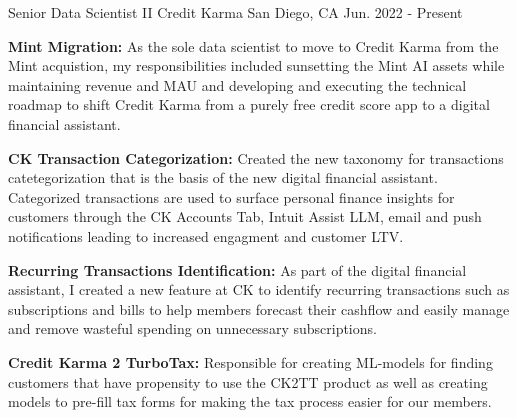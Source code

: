 


\begin{cventries}




\cventry
    {Senior Data Scientist II} %
    {Credit Karma} %
    {San Diego, CA} %
    {Jun. 2022 - Present} %
    {\begin{cvitems}
        \setlength\itemsep{.15em}
        \item { \textbf{Mint Migration: } As the sole data scientist to move to Credit Karma from the Mint acquistion, my responsibilities included sunsetting the Mint AI assets while maintaining revenue and MAU and developing and executing the technical roadmap  to shift Credit Karma from a purely free credit score app to a digital financial assistant.  }
        \item { \textbf{CK Transaction Categorization: } Created the new taxonomy for transactions catetegorization that is the basis of the new digital financial
        assistant. Categorized transactions are used to surface personal finance insights for customers through the CK Accounts Tab, Intuit Assist LLM, email and push notifications leading to increased engagment and customer LTV.}
         \item { \textbf{Recurring Transactions Identification: } As part of the digital financial assistant, I created a new feature at CK to identify recurring transactions such as subscriptions and bills to help members forecast their cashflow and easily manage and remove wasteful spending on unnecessary subscriptions.}
         \item { \textbf{Credit Karma 2 TurboTax:} Responsible for creating ML-models for finding customers that have propensity to use the CK2TT product as well as creating models to pre-fill tax forms for making the tax process easier for our members. }
     \end{cvitems}}



\end{cventries}
